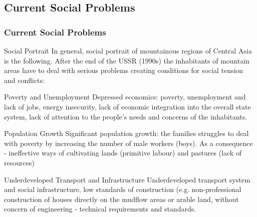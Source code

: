 \documentclass[pdflatex,compress,8pt,
	xcolor={dvipsnames,dvipsnames,svgnames,x11names,table},
	hyperref={colorlinks = true,
	breaklinks = true, 
	urlcolor = NavyBlue, 
	breaklinks = true}]{beamer}
\begin{document}
\subsection{Current Social Problems}
\begin{frame}\frametitle{Current Social Problems}

\begin{block}{Social Portrait}
In general, social portrait of mountainous regions of Central Asia is the following. After the end of the USSR (1990s) the inhabitants of mountain areas have to deal with serious problems creating conditions for social tension and conflicts:
\end{block}

\begin{alertblock}{Poverty and Unemployment}
Depressed economics: poverty, unemployment and lack of jobs, energy insecurity, lack of economic integration into the overall state system, lack of attention to the people’s needs and concerns of the inhabitants.
\end{alertblock}

\begin{block}{Population Growth}
Significant population growth: the families struggles to deal with poverty by increasing the number of male workers (boys). As a consequence - ineffective ways of cultivating lands (primitive labour) and pastures (lack of resources)
\end{block}

\begin{alertblock}{Underdeveloped Transport and Infrastructure}
Underdeveloped transport system and social infrastructure, low standards of construction (e.g. non-professional construction of houses directly on the mudflow areas or arable land, without concern of engineering - technical requirements and standards.
\end{alertblock}

\end{frame}
\end{document}
